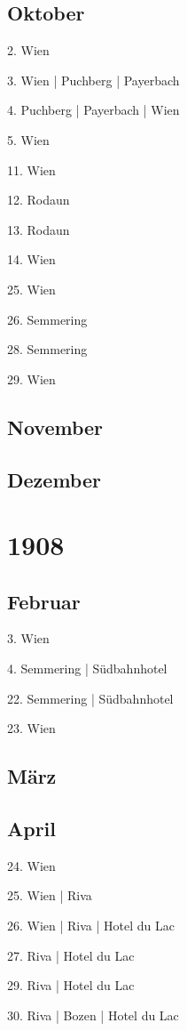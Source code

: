 \documentclass[twoside=false,titlepage=false,open=any, parskip=never, fontsize=10pt, headings=small, chapterprefix=false, appendixprefix=false, DIV=15]{scrbook}
\begin{document}
\begin{multicols}{3}
            \section*{Oktober}
            2. Wien\par
            3. Wien | Puchberg | Payerbach\par
            4. Puchberg | Payerbach | Wien\par
            5. Wien\par
            11. Wien\par
            12. Rodaun\par
            13. Rodaun\par
            14. Wien\par
            25. Wien\par
            26. Semmering\par
            28. Semmering\par
            29. Wien\par
            \section*{November}
            \section*{Dezember}
            \chapter*{1908}
            \section*{Februar}
            3. Wien\par
            4. Semmering | Südbahnhotel\par
            22. Semmering | Südbahnhotel\par
            23. Wien\par
            \section*{März}
            \section*{April}
            24. Wien\par
            25. Wien | Riva\par
            26. Wien | Riva | Hotel du Lac\par
            27. Riva | Hotel du Lac\par
            29. Riva | Hotel du Lac\par
            30. Riva | Bozen | Hotel du Lac\par

\end{multicols}
\end{document}
